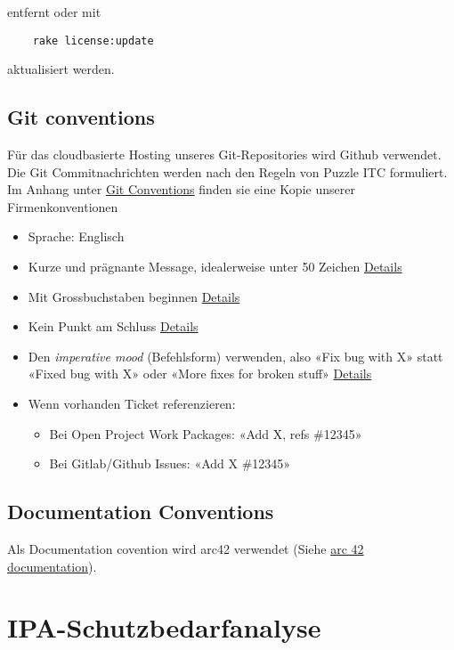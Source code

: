 entfernt oder mit 

\begin{verbatim}
    rake license:update 
\end{verbatim} aktualisiert werden.

\newpage

\section{Git conventions}
Für das cloudbasierte Hosting unseres Git-Repositories wird Github verwendet. 
Die Git Commitnachrichten werden nach den Regeln von Puzzle ITC formuliert. Im Anhang
unter \hyperref[sec:gitconv]{Git Conventions} finden sie eine Kopie unserer Firmenkonventionen

\begin{itemize}
    \item Sprache: Englisch
    \item Kurze und prägnante Message, idealerweise unter 50 Zeichen \href{https://cbea.ms/git-commit/#limit-50}{Details}
    \item Mit Grossbuchstaben beginnen \href{https://cbea.ms/git-commit/#capitalize}{Details}
    \item Kein Punkt am Schluss \href{https://cbea.ms/git-commit/#end}{Details}
    \item Den \textit{imperative mood} (Befehlsform) verwenden, also «Fix bug with X» statt «Fixed bug with X» oder «More fixes for broken stuff» \href{https://cbea.ms/git-commit/#imperative}{Details}
    \item Wenn vorhanden Ticket referenzieren:
    \begin{itemize}
        \item Bei Open Project Work Packages: «Add X, refs \#12345»
        \item Bei Gitlab/Github Issues: «Add X \#12345»
    \end{itemize}
\end{itemize}

\section{Documentation Conventions}
Als Documentation covention wird arc42 verwendet (Siehe \href{https://arc42.org/documentation/}{arc 42 documentation}). 

\chapter{IPA-Schutzbedarfanalyse}

